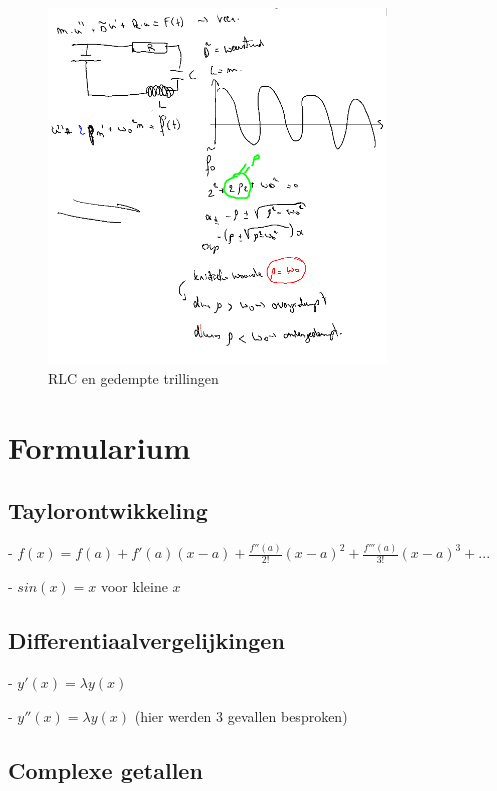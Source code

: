 \documentclass[a4paper]{report}
\begin{document}
\begin{figure}[H]
	\centering
	\includegraphics[width=0.8\textwidth]{assets/rlc-stuff.png}
	\caption{RLC en gedempte trillingen}
	\label{fig:rlc-stuff}
\end{figure}

\section*{Formularium}

\subsection*{Taylorontwikkeling}

- $ f(x) = f(a) + f'(a)(x-a) + \frac{f''(a)}{2!}(x-a)^2 + \frac{f'''(a)}{3!}(x-a)^3 + ... $

- $sin(x) = x$ voor kleine $x$

\subsection*{Differentiaalvergelijkingen}

- $y'(x) = \lambda y(x)$

- $y''(x) = \lambda y(x)$ (hier werden 3 gevallen besproken)

\subsection*{Complexe getallen}
\end{document}
